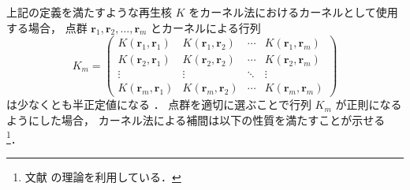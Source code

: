 上記の定義を満たすような再生核 $K$ をカーネル法におけるカーネルとして使用する場合，
点群 $\bm{r}_1, \bm{r}_2, \ldots, \bm{r}_m$ とカーネルによる行列
\begin{equation}
    K_m =
    \begin{pmatrix}
        K(\bm{r}_1, \bm{r}_1) & K(\bm{r}_1, \bm{r}_2) & \cdots & K(\bm{r}_1, \bm{r}_m) \\
        K(\bm{r}_2, \bm{r}_1) & K(\bm{r}_2, \bm{r}_2) & \cdots & K(\bm{r}_2, \bm{r}_m) \\
        \vdots                & \vdots                & \ddots & \vdots                \\
        K(\bm{r}_m, \bm{r}_1) & K(\bm{r}_m, \bm{r}_2) & \cdots & K(\bm{r}_m, \bm{r}_m)
    \end{pmatrix}
\end{equation}
は少なくとも半正定値になる
\cite{Aronszajn1950}．
点群を適切に選ぶことで行列 $K_m$ が正則になるようにした場合，
カーネル法による補間は以下の性質を満たすことが示せる
\footnote{文献 \cite{Kimeldorf1971,Wahba1981} の理論を利用している．}．

